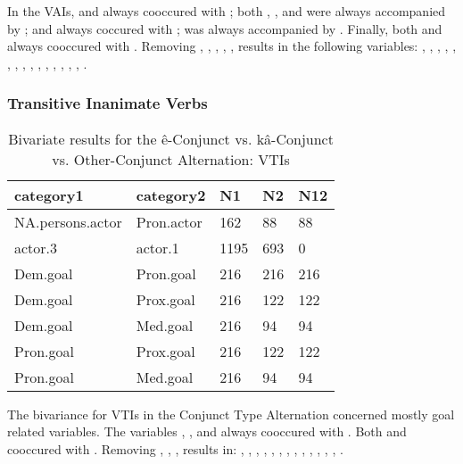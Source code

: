 In the VAIs,  and  always cooccured with ; both , , and  were always accompanied by ;  and  always coccured with ;  was always accompanied by . Finally, both  and  always cooccured with . Removing , , , , ,  results in the following variables: , , , , , , , , , , , , , , , .


\subsubsection{Transitive Inanimate Verbs}

\begin{table}[H]
\centering
\begin{tabular}{lllll}
\toprule
category1            & category2    & N1   & N2   & N12 \\
\midrule
NA.persons.actor      & Pron.actor & 162 & 88 & 88 \\
actor.3 & actor.1     & 1195 & 693 & 0 \\
Dem.goal & Pron.goal  & 216 & 216 & 216 \\
Dem.goal & Prox.goal  & 216 & 122 & 122 \\
Dem.goal & Med.goal   & 216 & 94 & 94 \\
Pron.goal & Prox.goal & 216 & 122 & 122 \\
Pron.goal & Med.goal  & 216 & 94 & 94 \\
\bottomrule
\end{tabular}
\caption{
   Bivariate results for the ê-Conjunct vs. kâ-Conjunct vs. Other-Conjunct Alternation: VTIs \\ \label{tab:ticnjuni}
  }
\end{table}

The bivariance for VTIs in the Conjunct Type Alternation concerned mostly goal related variables. The variables , , and  always cooccured with . Both  and  cooccured with . Removing , , ,  results in: , , , , , , , , , , , , , .







